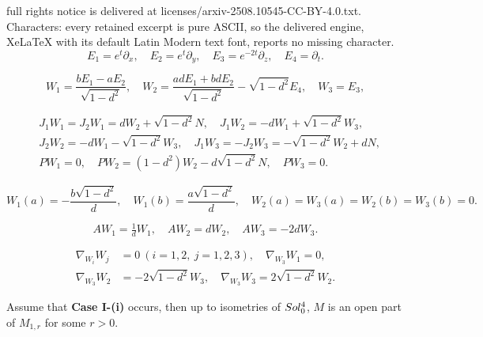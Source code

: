 \documentclass[10pt,a4paper]{amsart}
\begin{document}
full rights notice is delivered at licenses/arxiv-2508.10545-CC-BY-4.0.txt. Characters: every retained excerpt is pure ASCII, so the delivered engine, XeLaTeX with its default Latin Modern text font, reports no missing character.
	\begin{equation}\label{eqn:2.2}
		E_1=e^t \partial_x, \quad
		E_2=e^t \partial_y,\quad
		E_3=e^{-2t} \partial_z, \quad
		E_4= \partial_t.
	\end{equation}

	\begin{equation}\label{eqn:2.16}
		W_1=\frac{bE_1-a E_2}{\sqrt{1-d^2}}, \quad
		W_2=\frac{adE_1+bd E_2}{\sqrt{1-d^2}}-\sqrt{1-d^2}E_4, \quad
		W_3=E_3,
	\end{equation}

	\begin{equation}\label{eqn:2.20}
		\begin{aligned}
			&J_1W_1=J_2W_1=dW_2+\sqrt{1-d^2}N, \quad J_1W_2=-dW_1+\sqrt{1-d^2}W_3,\\
			&J_2W_2=-dW_1-\sqrt{1-d^2}W_3, \quad J_1W_3=-J_2W_3=-\sqrt{1-d^2}W_2+dN,\\
			& PW_1=0, \quad PW_2=(1-d^2)W_2-d\sqrt{1-d^2}N, \quad PW_3=0.
		\end{aligned}
	\end{equation}

		\begin{equation}\label{eqn:2.18}
			W_1(a)=-\frac{b\sqrt{1-d^2}}{d}, \quad 
			W_1(b)=\frac{a\sqrt{1-d^2}}{d},\quad 
			W_2(a)=W_3(a)
			= W_2(b)=W_3(b)=0.
		\end{equation}

		\begin{equation}\label{eqn:8.20}
			AW_1=\tfrac{1}{d}W_1, \quad AW_2=dW_2, \quad AW_3=-2dW_3.
		\end{equation}

		\begin{equation}\label{eqn:9.45}
			\begin{aligned}
				\nabla_{W_i}W_j&=0 \ ( i=1, 2, \ j=1, 2, 3), \quad \nabla_{W_3}W_1=0,\\
				\nabla_{W_3}W_2&=-2\sqrt{1-d^2}W_3, \quad
				\nabla_{W_3}W_3=2\sqrt{1-d^2}W_2.
			\end{aligned}
		\end{equation}

	\begin{lemma}\label{lem:4.4}
		Assume that {\bf Case I-(i)} occurs, then up to isometries of ${\rm Sol_0^4}$,
		$M$ is an open part of $M_{1,r}$ for some $r>0$.
	\end{lemma}
\end{document}
